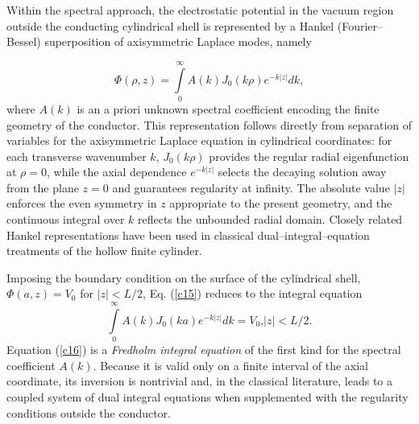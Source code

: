 \documentclass[12pt]{article}
\begin{document}
Within the spectral approach, the electrostatic potential in the vacuum region
outside the conducting cylindrical shell is represented by a Hankel
(Fourier--Bessel) superposition of axisymmetric Laplace modes, namely%

\begin{equation}
\Phi(\rho,z)=\int\limits_{0}^{\infty}A(k)J_{0}(k\rho)e^{-k\left|  z\right|
}dk, \label{c15}%
\end{equation}
where $A(k)$ is an a priori unknown spectral coefficient encoding the finite
geometry of the conductor. This representation follows directly from
separation of variables for the axisymmetric Laplace equation in cylindrical
coordinates: for each transverse wavenumber $k$, $J_{0}(k\rho)$ provides the
regular radial eigenfunction at $\rho=0$, while the axial dependence
$e^{-k\left|  z\right|  }$ selects the decaying solution away from the plane
$z=0$ and guarantees regularity at infinity. The absolute value $\left|
z\right|  $ enforces the even symmetry in $z$ appropriate to the present
geometry, and the continuous integral over $k$ reflects the unbounded radial
domain. Closely related Hankel representations have been used in classical
dual--integral--equation treatments of the hollow finite
cylinder\cite{c2a,c2b,c2c,c3,c4}.

Imposing the boundary condition on the surface of the cylindrical shell,
$\Phi(a,z)=V_{0}$ for $\left|  z\right|  <L/2$, Eq. (\ref{c15}) reduces to the
integral equation%
\begin{equation}
\int\limits_{0}^{\infty}A(k)J_{0}(ka)e^{-k\left|  z\right|  }dk=V_{0}\text{,
}\left|  z\right|  <L/2. \label{c16}%
\end{equation}
Equation (\ref{c16}) is a \textit{Fredholm integral equation} of the first
kind for the spectral coefficient $A(k)$. Because it is valid only on a finite
interval of the axial coordinate, its inversion is nontrivial and, in the
classical literature, leads to a coupled system of dual integral equations
when supplemented with the regularity conditions outside the
conductor\cite{c2a,c2b,c2c,c3,c4}.
\end{document}
